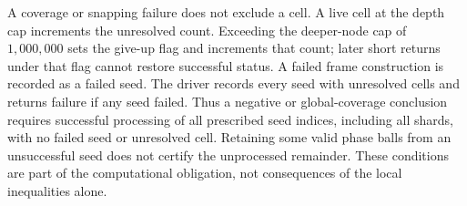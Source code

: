 A coverage or snapping failure does not exclude a cell.  A live cell at the
depth cap increments the unresolved count.  Exceeding the deeper-node cap
of $1{,}000{,}000$ sets the give-up flag and increments that count; later
short returns under that flag cannot restore successful status.  A failed
frame construction is recorded as a failed seed.  The driver records every
seed with unresolved cells and returns failure if any seed failed.  Thus a
negative or global-coverage conclusion requires successful processing of
all prescribed seed indices, including all shards, with no failed seed or
unresolved cell.  Retaining some valid phase balls from an unsuccessful
seed does not certify the unprocessed remainder.  These conditions are
part of the computational obligation, not consequences of the local
inequalities alone.
